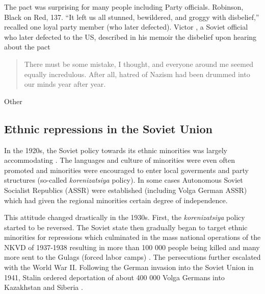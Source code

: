 The pact was surprising for many people including Party officials. 
Robinson, Black on Red, 137. “It left us all stunned, bewildered, and groggy with disbelief,” recalled one loyal party member (who later defected). 
Victor  \citet[p. 332]{kravchenko_i_1947}, a Soviet official who later defected to the US,   described in  his memoir the disbelief upon hearing about the pact  

\begin{quote}
There must be some mistake, I thought, and everyone around me seemed equally incredulous. After all, hatred of Nazism had been drummed into our minds year after year.    

\end{quote}

Other 
\subsection{Ethnic repressions in the Soviet Union}
In the 1920s, the Soviet policy towards its ethnic minorities was largely accommodating \citep{martin_affirmative_2001}. The languages and culture of minorities were even often promoted and minorities were encouraged to enter local goverments and party structures (so-called \emph{korenizatsiya} policy). In some cases Autonomous Soviet Socialist Republics (ASSR) were established (including Volga German ASSR) which had given the regional minorities certain degree of independence.  

This attitude changed drastically in the 1930s. First, the  \emph{korenizatsiya} policy started to be reversed. The Soviet state then gradually  began to target ethnic minorities for repressions  which culminated in the mass national operations of the NKVD of 1937-1938 resulting in more than 100 000 people being killed and many more sent to the Gulags (forced labor camps) \citep{martin_origins_1998, gregory_terror_2009, snyder_bloodlands:_2011}. 
The persecutions  further escalated with the World War II. Following the German invasion into the Soviet Union in 1941, Stalin ordered deportation of about 400 000 Volga Germans into Kazakhstan and Siberia \citep{polian_against_2003}.